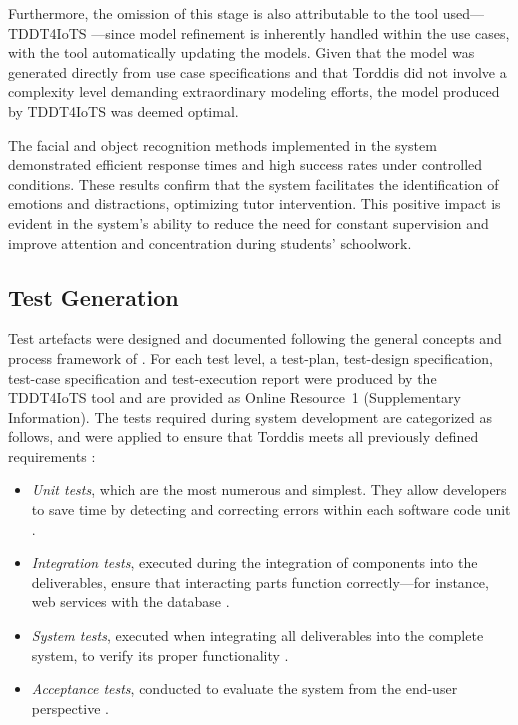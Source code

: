                 Furthermore, the omission of this stage is also attributable to the tool used—TDDT4IoTS \citep{Guerrero2024Test}—since model refinement is inherently handled within the use cases, with the tool automatically updating the models. Given that the model was generated directly from use case specifications and that Torddis did not involve a complexity level demanding extraordinary modeling efforts, the model produced by TDDT4IoTS was deemed optimal.
                
                The facial and object recognition methods implemented in the system demonstrated efficient response times and high success rates under controlled conditions. These results confirm that the system facilitates the identification of emotions and distractions, optimizing tutor intervention. This positive impact is evident in the system’s ability to reduce the need for constant supervision and improve attention and concentration during students’ schoolwork.
                
                \subsection{Test Generation}
                Test artefacts were designed and documented following the general concepts and process framework of \citet{ISO-IEC-IEEE29119-1-2022}. For each test level, a test-plan, test-design specification, test-case specification and test-execution report were produced by the TDDT4IoTS tool and are provided as Online Resource~1 (Supplementary Information). The tests required during system development are categorized as follows, and were applied to ensure that Torddis meets all previously defined requirements \citep{Sciarra2024Smash}:
                
                \begin{itemize}
                    \item \textit{Unit tests}, which are the most numerous and simplest. They allow developers to save time by detecting and correcting errors within each software code unit \citep{Mafi2024Regression}.
                    
                    \item \textit{Integration tests}, executed during the integration of components into the deliverables, ensure that interacting parts function correctly—for instance, web services with the database \citep{Spath2025Spring}.
                    
                    \item \textit{System tests}, executed when integrating all deliverables into the complete system, to verify its proper functionality \citep{Smytzek2024Tests4Py, Wang2024Ctest4J}.
                    
                    \item \textit{Acceptance tests}, conducted to evaluate the system from the end-user perspective \citep{Augusto2025Software}.
                \end{itemize}
                
